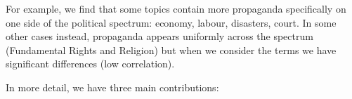 
For example, we find that some topics contain more propaganda specifically on one side of the political spectrum: economy, labour, disasters, court. In some other cases instead, propaganda appears uniformly across the spectrum (Fundamental Rights and Religion) but when we consider the terms we have significant differences (low correlation).




In more detail, we have three main contributions:

